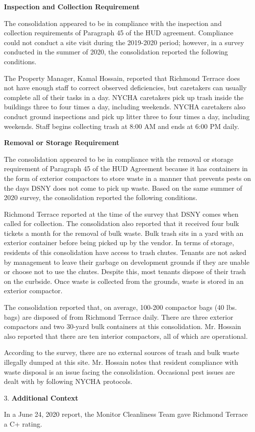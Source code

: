 
\textbf{Inspection and Collection Requirement}

The consolidation appeared to be in compliance with the inspection and collection requirements of Paragraph 45 of the HUD agreement. Compliance could not conduct a site visit during the 2019-2020 period; however, in a survey conducted in the summer of 2020, the consolidation reported the following conditions.

The Property Manager, Kamal Hossain, reported that Richmond Terrace does not have enough staff to correct observed deficiencies, but caretakers can usually complete all of their tasks in a day. NYCHA caretakers pick up trash inside the buildings three to four times a day, including weekends. NYCHA caretakers also conduct ground inspections and pick up litter three to four times a day, including weekends. Staff begins collecting trash at 8:00 AM and ends at 6:00 PM daily.

\textbf{Removal or Storage Requirement}

The consolidation appeared to be in compliance with the  removal or storage requirement of Paragraph  45 of the HUD Agreement because it has containers in the form of exterior compactors to store waste in a manner that prevents pests on the days DSNY does not come to pick up waste. Based on the same summer of  2020 survey, the consolidation reported the following conditions.

Richmond Terrace reported at the time of the survey that DSNY comes when called for collection. The consolidation also reported that it received four bulk tickets a month for the removal of bulk waste. Bulk trash sits in a yard with an exterior container before being picked up by the vendor. In terms of storage, residents of this consolidation have access to trash chutes. Tenants are not asked by management to leave their garbage on development grounds if they are unable or choose not to use the chutes. Despite this, most tenants dispose of their trash on the curbside. Once waste is collected from the grounds, waste is stored in an exterior compactor. 

The consolidation reported that, on average, 100-200 compactor bags (40 lbs. bags) are disposed of from Richmond Terrace daily. There are three exterior compactors and two 30-yard bulk containers at this consolidation. Mr. Hossain also reported that there are ten interior compactors, all of which are operational.  

According to the survey, there are no external sources of trash and bulk waste illegally dumped at this site. Mr. Hossain notes that resident compliance with waste disposal is an issue facing the consolidation. Occasional pest issues are dealt with by following NYCHA protocols. 

3. \textbf{Additional Context} 

In a June 24, 2020 report, the Monitor Cleanliness Team gave Richmond Terrace a C+ rating. 